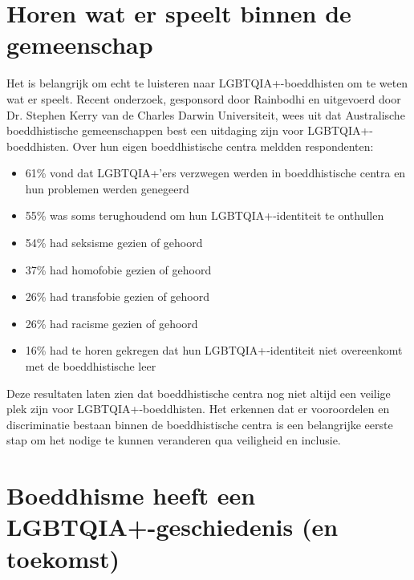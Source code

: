 \documentclass[12pt,openany]{book}
\begin{document}

\section*{Horen wat er speelt binnen de gemeenschap}

Het is belangrijk om echt te luisteren naar LGBTQIA+-boeddhisten om te weten wat er speelt. Recent onderzoek, gesponsord door Rainbodhi en uitgevoerd door Dr. Stephen Kerry van de Charles Darwin Universiteit, wees uit dat Australische boeddhistische gemeenschappen best een uitdaging zijn voor LGBTQIA+-boeddhisten. Over hun eigen boeddhistische centra meldden respondenten:

\begin{itemize}
  \item 61\% vond dat LGBTQIA+’ers verzwegen werden in boeddhistische centra en hun problemen werden genegeerd
  \item 55\% was soms terughoudend om hun LGBTQIA+-identiteit te onthullen
  \item 54\% had seksisme gezien of gehoord
  \item 37\% had homofobie gezien of gehoord
  \item 26\% had transfobie gezien of gehoord
  \item 26\% had racisme gezien of gehoord
  \item 16\% had te horen gekregen dat hun LGBTQIA+-identiteit niet overeenkomt met de boeddhistische leer
\end{itemize}

Deze resultaten laten zien dat boeddhistische centra nog niet altijd een veilige plek zijn voor LGBTQIA+-boeddhisten. Het erkennen dat er vooroordelen en discriminatie bestaan binnen de boeddhistische centra is een belangrijke eerste stap om het nodige te kunnen veranderen qua veiligheid en inclusie.

\section*{Boeddhisme heeft een LGBTQIA+-geschiedenis (en toekomst)}
\end{document}
